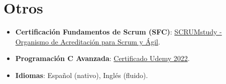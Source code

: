 \documentclass[letterpaper,11pt]{article}
\newcommand{\resumeItem}[2]{
  \item\small{
    \textbf{#1}{: #2 \vspace{-2pt}}
  }
}
\newcommand{\resumeSubItem}[2]{\resumeItem{#1}{#2}\vspace{-4pt}}
\newcommand{\resumeSubHeadingListStart}{\begin{itemize}[leftmargin=*]}
\newcommand{\resumeSubHeadingListEnd}{\end{itemize}}
\begin{document}
\section{Otros}
\resumeSubHeadingListStart
\resumeSubItem{Certificación Fundamentos de Scrum (SFC)}{
	\href{https://www.scrumstudy.com/certification/verify?type=SFC&number=931455}{SCRUMstudy - Organismo de Acreditación para Scrum y Ágil}.}
\resumeSubItem{Programación C Avanzada}{
	\href{https://ude.my/UC-0dadf9b3-11ae-4f4d-8a76-6f1aa45b2b53/}{Certificado Udemy 2022}.}
\resumeSubItem{Idiomas}{Español (nativo), Inglés (fluido).}
\resumeSubHeadingListEnd
\end{document}
